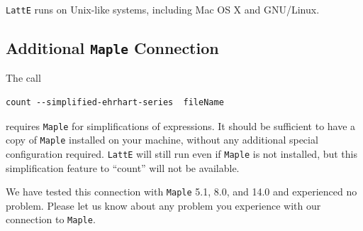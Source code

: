 \documentclass{article}
\newcommand{\latte}{{\tt LattE}\xspace}
\newcommand{\maple}{{\tt Maple}\xspace}
\begin{document}
\latte runs on Unix-like systems, including Mac OS X and GNU/Linux.



\subsection{Additional \maple Connection}
The call
\begin{verbatim}
count --simplified-ehrhart-series  fileName
\end{verbatim}
requires \maple for simplifications of expressions. It should be
sufficient to have a copy of \maple installed on your machine,
without any additional special configuration required.  \latte
will still run even if \maple is not installed, but this
simplification feature to ``count'' will not be available. 

We have tested this connection with \maple 5.1, 8.0, and 14.0 and experienced
no problem. Please let us know about any problem you experience with
our connection to \maple.


\end{document}
